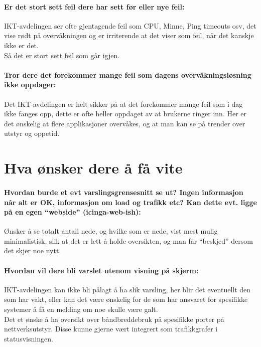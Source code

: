 \paragraph{Er det stort sett feil dere har sett før eller nye feil:}
IKT-avdelingen ser ofte gjentagende feil som CPU, Minne, Ping timeouts osv, det vise rødt på overvåkningen og er irriterende at det viser som feil, når det kanskje ikke er det. \\

\noindent Så det er stort sett feil som går igjen.

\paragraph{Tror dere det forekommer mange feil som dagens overvåkningsløsning ikke oppdager:}
Det IKT-avdelingen er helt sikker på at det forekommer mange feil som i dag ikke fanges opp, dette er ofte heller oppdaget av at brukerne ringer inn. Her er det ønskelig at flere applikasjoner overvåkes, og at man kan se på trender over utstyr og oppetid.
\clearpage
\section{Hva ønsker dere å få vite}
\paragraph{Hvordan burde et evt varslingsgrensesnitt se ut? Ingen informasjon når alt er OK, informasjon om load og trafikk etc? Kan dette evt. ligge på en egen “webside” (icinga-web-ish):}
Ønsker å se totalt antall nede, og hvilke som er nede, vist mest mulig minimalistisk, slik at det er lett å holde oversikten, og man får “beskjed” dersom det skjer noe nytt.
\paragraph{Hvordan vil dere bli varslet utenom visning på skjerm:}
IKT-avdelingen kan ikke bli pålagt å ha slik varsling, her blir det eventuellt den som har vakt, eller kan det være ønskelig for de som har ansvaret for spesifikke systemer å få en melding om noe skulle være galt.\\

\noindent Det et ønske å ha oversikt over båndbreddebruk på spesifikke porter på nettverksutstyr. Disse kunne gjerne vært integrert som trafikkgrafer i statusvisningen.


